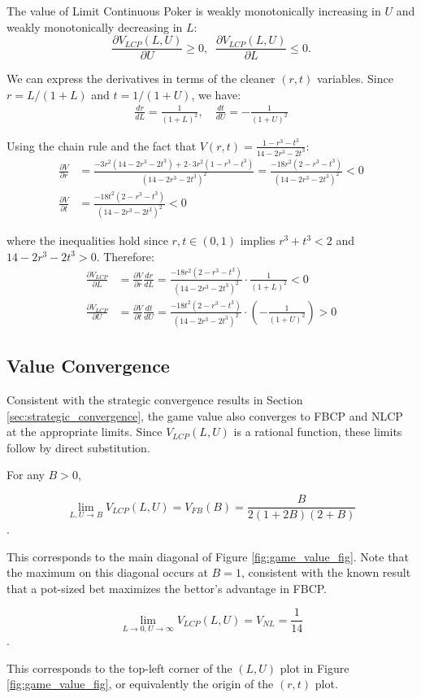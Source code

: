 \documentclass[../../main/main.tex]{subfiles}
\begin{document}
\begin{theorem}
    The value of Limit Continuous Poker is weakly monotonically increasing in $U$ and weakly monotonically decreasing in $L$:
\[
    \frac{\partial V_{LCP}(L, U)}{\partial U} \geq 0, \;\; \frac{\partial V_{LCP}(L, U)}{\partial L} \leq 0.
\]
\end{theorem}
\begin{customproof}
    We can express the derivatives in terms of the cleaner $(r,t)$ variables. Since $r = L/(1+L)$ and $t = 1/(1+U)$, we have:
    \begin{align*}
        \frac{dr}{dL} = \frac{1}{(1+L)^2}, \quad \frac{dt}{dU} = -\frac{1}{(1+U)^2}
    \end{align*}

    Using the chain rule and the fact that $V(r,t) = \frac{1-r^3-t^3}{14-2r^3-2t^3}$:
    \begin{align*}
        \frac{\partial V}{\partial r} &= \frac{-3r^2(14-2r^3-2t^3) + 2 \cdot 3r^2(1-r^3-t^3)}{(14-2r^3-2t^3)^2} = \frac{-18r^2(2-r^3-t^3)}{(14-2r^3-2t^3)^2} < 0\\
        \frac{\partial V}{\partial t} &= \frac{-18t^2(2-r^3-t^3)}{(14-2r^3-2t^3)^2} < 0
    \end{align*}

    where the inequalities hold since $r, t \in (0,1)$ implies $r^3 + t^3 < 2$ and $14 - 2r^3 - 2t^3 > 0$. Therefore:
    \begin{align*}
        \frac{\partial V_{LCP}}{\partial L} &= \frac{\partial V}{\partial r} \frac{dr}{dL} = \frac{-18r^2(2-r^3-t^3)}{(14-2r^3-2t^3)^2} \cdot \frac{1}{(1+L)^2} < 0 \\
        \frac{\partial V_{LCP}}{\partial U} &= \frac{\partial V}{\partial t} \frac{dt}{dU} = \frac{-18t^2(2-r^3-t^3)}{(14-2r^3-2t^3)^2} \cdot \left(-\frac{1}{(1+U)^2}\right) > 0
    \end{align*}
\end{customproof}

\subsection{Value Convergence}

Consistent with the strategic convergence results in Section \ref{sec:strategic_convergence}, the game value also converges to FBCP and NLCP at the appropriate limits. Since $V_{LCP}(L,U)$ is a rational function, these limits follow by direct substitution.

\begin{remark}
For any $B > 0$, 

\[ \lim_{L,U \to B} V_{LCP}(L, U) = V_{FB}(B) = \frac{B}{2(1+2B)(2+B)} \].

This corresponds to the main diagonal of Figure \ref{fig:game_value_fig}. Note that the maximum on this diagonal occurs at $B=1$, consistent with the known result that a pot-sized bet maximizes the bettor's advantage in FBCP.
\end{remark}

\begin{remark}
\[ \lim_{L \to 0, U \to \infty} V_{LCP}(L, U) = V_{NL} = \frac{1}{14} \]. 

This corresponds to the top-left corner of the $(L,U)$ plot in Figure \ref{fig:game_value_fig}, or equivalently the origin of the $(r,t)$ plot.
\end{remark}
\end{document}
